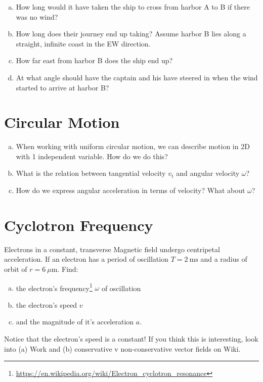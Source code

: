 \documentclass[10pt]{article}
\begin{document}
\begin{enumerate}[(a)]
	\item How long would it have taken the ship to cross from harbor A to B if there was no wind?	
	\item How long does their journey end up taking? Assume harbor B lies along a straight, infinite coast in the EW direction.
	\item How far east from harbor B does the ship end up? 
	\item At what angle should have the captain and his have steered in when the wind started to arrive at harbor B? 
\end{enumerate}


\section{Circular Motion}
\begin{enumerate}[(a)]

\item When working with uniform circular motion, we can describe motion in 2D with 1 independent variable. How do we do this?
\item What is the relation between tangential velocity $v_\mathrm{t}$ and angular velocity $\omega$?
\item How do we express angular acceleration in terms of velocity? What about $\omega$?	

\end{enumerate}


\section{Cyclotron Frequency}

Electrons in a constant, transverse Magnetic field undergo centripetal acceleration. If an electron has a period of oscillation $T = 2 \ \mathrm{ms}$ and a radius of orbit of $r = 6 \ \mu\mathrm{m}.$ Find:
\begin{enumerate}[(a)]
	\item the electron's frequency\footnote{\url{https://en.wikipedia.org/wiki/Electron_cyclotron_resonance}} $\omega$ of oscillation
	\item the electron's speed $v$
	\item and the magnitude of it's acceleration $a$.
\end{enumerate}


\noindent
Notice that the electron's speed is a constant! If you think this is interesting, look into (a) Work and (b) conservative v non-conservative vector fields on Wiki.
\end{document}

